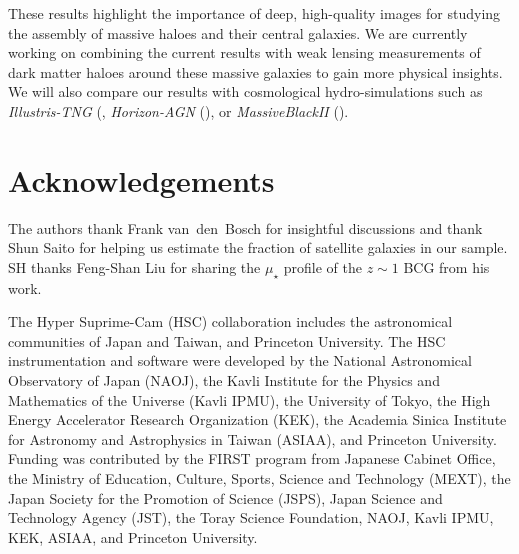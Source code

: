 \documentclass[a4paper,fleqn,usenatbib]{mnras}
\def\mden{{$\mu_{\star}$}}
\begin{document}
    These results highlight the importance of deep, high-quality images for studying 
    the assembly of massive haloes and their central galaxies. 
    We are currently working on combining the current results with weak lensing 
    measurements of dark matter haloes around these massive galaxies to gain more physical 
    insights. 
    We will also compare our results with cosmological hydro-simulations 
    such as 
    \textit{Illustris-TNG} (\citealt{Pillepich2017a, Pillepich2017b, Weinberger2017}, 
    \textit{Horizon-AGN} (\citealt{Dubois2014}), or 
    \textit{MassiveBlackII} (\citealt{Khandai2015}).

  
\section*{Acknowledgements}

  The authors thank Frank van~den~Bosch for insightful discussions and thank 
  Shun Saito for helping us estimate the fraction of satellite galaxies in our sample.
  SH thanks Feng-Shan Liu for sharing the \mden{} profile of the $z\sim1$ BCG from 
  his work.

  The Hyper Suprime-Cam (HSC) collaboration includes the astronomical communities of 
  Japan and Taiwan, and Princeton University.  The HSC instrumentation and software were
  developed by the National Astronomical Observatory of Japan (NAOJ), the Kavli Institute
  for the Physics and Mathematics of the Universe (Kavli IPMU), the University of Tokyo,
  the High Energy Accelerator Research Organization (KEK), the Academia Sinica Institute
  for Astronomy and Astrophysics in Taiwan (ASIAA), and Princeton University.  
  Funding was contributed by the FIRST program from Japanese Cabinet Office, the Ministry 
  of Education, Culture, Sports, Science and Technology (MEXT), the Japan Society for 
  the Promotion of Science (JSPS), Japan Science and Technology Agency (JST), the
  Toray Science Foundation, NAOJ, Kavli IPMU, KEK, ASIAA, and Princeton University.
   
\end{document}
